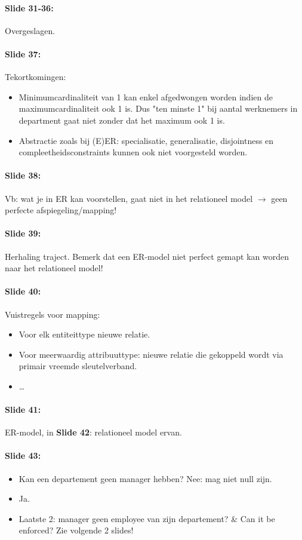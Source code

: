 \documentclass[10pt,a4paper]{report}
\begin{document}
\paragraph{Slide 31-36:}Overgeslagen.

\paragraph{Slide 37:}Tekortkomingen:
\begin{itemize}
\item Minimumcardinaliteit van 1 kan enkel afgedwongen worden indien de maximumcardinaliteit ook 1 is. Dus "ten minste 1" bij aantal werknemers in department gaat niet zonder dat het maximum ook 1 is.
\item Abstractie zoals bij (E)ER: specialisatie, generalisatie, disjointness en compleetheidsconstraints kunnen ook niet voorgesteld worden.
\end{itemize}	

\paragraph{Slide 38:}Vb: wat je in ER kan voorstellen, gaat niet in het relationeel model $\rightarrow$ geen perfecte afspiegeling/mapping!

\paragraph{Slide 39:}Herhaling traject. Bemerk dat een ER-model niet perfect gemapt kan worden naar het relationeel model!

\paragraph{Slide 40:}Vuistregels voor mapping:
\begin{itemize}
\item Voor elk entiteittype nieuwe relatie.
\item Voor meerwaardig attribuuttype: nieuwe relatie die gekoppeld wordt via primair vreemde sleutelverband.
\item …
\end{itemize}

\paragraph{Slide 41:}ER-model, in \textbf{Slide 42}: relationeel model ervan.

\paragraph{Slide 43:}
\begin{itemize}
\item Kan een departement geen manager hebben? Nee: mag niet null zijn.
\item Ja.
\item Laatste 2: manager geen employee van zijn departement? \& Can it be enforced? Zie volgende 2 slides!
\end{itemize}
\end{document}
